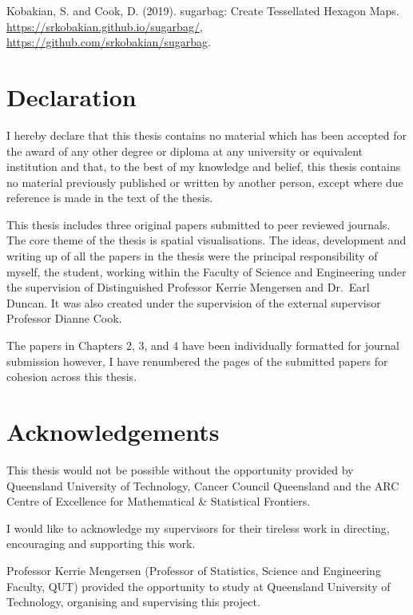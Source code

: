 \documentclass{monashthesis}
\begin{document}
Kobakian, S. and Cook, D. (2019). sugarbag: Create Tessellated Hexagon Maps. \url{https://srkobakian.github.io/sugarbag/}, \url{https://github.com/srkobakian/sugarbag}.

\clearpage{}\setcounter{page}{0}

\hypertarget{declaration}{%
\chapter*{Declaration}\label{declaration}}

I hereby declare that this thesis contains no material which has been accepted for the award of any other degree or diploma at any university or equivalent institution and that, to the best of my knowledge and belief, this thesis contains no material previously published or written by another person, except where due reference is made in the text of the thesis.

This thesis includes three original papers submitted to peer reviewed journals. The core theme of the thesis is spatial visualisations. The ideas, development and writing up of all the papers in the thesis were the principal responsibility of myself, the student, working within the Faculty of Science and Engineering under the supervision of Distinguished Professor Kerrie Mengersen and Dr.~Earl Duncan. It was also created under the supervision of the external supervisor Professor Dianne Cook.

The papers in Chapters 2, 3, and 4 have been individually formatted for journal submission however, I have renumbered the pages of the submitted papers for cohesion across this thesis.

\hypertarget{acknowledgements}{%
\chapter*{Acknowledgements}\label{acknowledgements}}

This thesis would not be possible without the opportunity provided by Queensland University of Technology, Cancer Council Queensland and the ARC Centre of Excellence for Mathematical \& Statistical Frontiers.

I would like to acknowledge my supervisors for their tireless work in directing, encouraging and supporting this work.

Professor Kerrie Mengersen (Professor of Statistics, Science and Engineering Faculty, QUT) provided the opportunity to study at Queensland University of Technology, organising and supervising this project.
\end{document}
